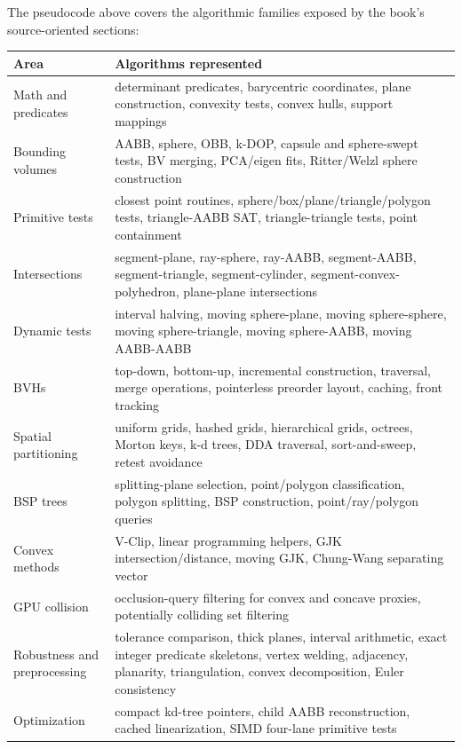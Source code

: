\documentclass[10pt,letterpaper]{article}
\begin{document}
The pseudocode above covers the algorithmic families exposed by the book's source-oriented sections:


\begin{longtable}{L{0.30\textwidth}L{0.65\textwidth}}
\toprule
\textbf{Area} & \textbf{Algorithms represented}\\
\midrule
Math and predicates & determinant predicates, barycentric coordinates, plane construction, convexity tests, convex hulls, support mappings\\
Bounding volumes & AABB, sphere, OBB, k-DOP, capsule and sphere-swept tests, BV merging, PCA/eigen fits, Ritter/Welzl sphere construction\\
Primitive tests & closest point routines, sphere/box/plane/triangle/polygon tests, triangle-AABB SAT, triangle-triangle tests, point containment\\
Intersections & segment-plane, ray-sphere, ray-AABB, segment-AABB, segment-triangle, segment-cylinder, segment-convex-polyhedron, plane-plane intersections\\
Dynamic tests & interval halving, moving sphere-plane, moving sphere-sphere, moving sphere-triangle, moving sphere-AABB, moving AABB-AABB\\
BVHs & top-down, bottom-up, incremental construction, traversal, merge operations, pointerless preorder layout, caching, front tracking\\
Spatial partitioning & uniform grids, hashed grids, hierarchical grids, octrees, Morton keys, k-d trees, DDA traversal, sort-and-sweep, retest avoidance\\
BSP trees & splitting-plane selection, point/polygon classification, polygon splitting, BSP construction, point/ray/polygon queries\\
Convex methods & V-Clip, linear programming helpers, GJK intersection/distance, moving GJK, Chung-Wang separating vector\\
GPU collision & occlusion-query filtering for convex and concave proxies, potentially colliding set filtering\\
Robustness and preprocessing & tolerance comparison, thick planes, interval arithmetic, exact integer predicate skeletons, vertex welding, adjacency, planarity, triangulation, convex decomposition, Euler consistency\\
Optimization & compact kd-tree pointers, child AABB reconstruction, cached linearization, SIMD four-lane primitive tests\\
\bottomrule
\end{longtable}
\end{document}
